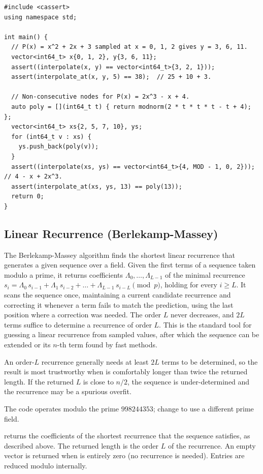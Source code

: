\begin{lstlisting}[style=cpp]
#include <cassert>
using namespace std;

int main() {
  // P(x) = x^2 + 2x + 3 sampled at x = 0, 1, 2 gives y = 3, 6, 11.
  vector<int64_t> x{0, 1, 2}, y{3, 6, 11};
  assert((interpolate(x, y) == vector<int64_t>{3, 2, 1}));
  assert(interpolate_at(x, y, 5) == 38);  // 25 + 10 + 3.

  // Non-consecutive nodes for P(x) = 2x^3 - x + 4.
  auto poly = [](int64_t t) { return modnorm(2 * t * t * t - t + 4); };
  vector<int64_t> xs{2, 5, 7, 10}, ys;
  for (int64_t v : xs) {
    ys.push_back(poly(v));
  }
  assert((interpolate(xs, ys) == vector<int64_t>{4, MOD - 1, 0, 2}));  // 4 - x + 2x^3.
  assert(interpolate_at(xs, ys, 13) == poly(13));
  return 0;
}
\end{lstlisting}
\subsection{Linear Recurrence (Berlekamp-Massey)}
\label{sec:6.6.5}
The Berlekamp-Massey algorithm finds the shortest linear recurrence that generates a given sequence over a field. Given the first terms of a sequence taken modulo a prime, it returns coefficients $\Lambda_0, \dots, \Lambda_{L-1}$ of the minimal recurrence $s_i = \Lambda_0 \, s_{i-1} + \Lambda_1 \, s_{i-2} + \dots + \Lambda_{L-1} \, s_{i-L} \pmod{p}$, holding for every $i \geq L$. It scans the sequence once, maintaining a current candidate recurrence and correcting it whenever a term fails to match the prediction, using the last position where a correction was needed. The order $L$ never decreases, and $2L$ terms suffice to determine a recurrence of order $L$. This is the standard tool for guessing a linear recurrence from sampled values, after which the sequence can be extended or its $n$-th term found by fast methods.

An order-$L$ recurrence generally needs at least $2L$ terms to be determined, so the result is most trustworthy when  is comfortably longer than twice the returned length. If the returned $L$ is close to $n / 2$, the sequence is under-determined and the recurrence may be a spurious overfit.

The code operates modulo the prime $998244353$; change  to use a different prime field.

\begin{compactitem}
  \item {} returns the coefficients of the shortest recurrence that the sequence  satisfies, as described above. The returned length is the order $L$ of the recurrence. An empty vector is returned when  is entirely zero (no recurrence is needed). Entries are reduced modulo  internally.
\end{compactitem}

